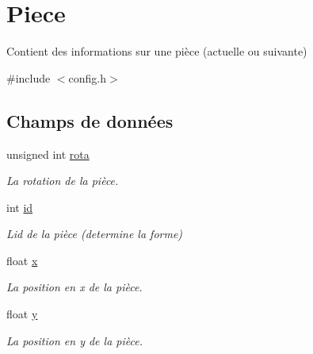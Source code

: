 \hypertarget{structPiece}{}\section{Piece}
\label{structPiece}


Contient des informations sur une pièce (actuelle ou suivante)  




{\ttfamily \#include $<$config.\+h$>$}

\subsection*{Champs de données}
\begin{DoxyCompactItemize}
\item 
\mbox{\label{structPiece_af1951f72b2ec34674a8575bc71398e1c}} 
unsigned int \hyperlink{structPiece_af1951f72b2ec34674a8575bc71398e1c}{rota}
\begin{DoxyCompactList}\small\item\em La rotation de la pièce. \end{DoxyCompactList}\item 
\mbox{\label{structPiece_a7441ef0865bcb3db9b8064dd7375c1ea}} 
int \hyperlink{structPiece_a7441ef0865bcb3db9b8064dd7375c1ea}{id}
\begin{DoxyCompactList}\small\item\em L\textquotesingle{}id de la pièce (determine la forme) \end{DoxyCompactList}\item 
\mbox{\label{structPiece_ad0da36b2558901e21e7a30f6c227a45e}} 
float \hyperlink{structPiece_ad0da36b2558901e21e7a30f6c227a45e}{x}
\begin{DoxyCompactList}\small\item\em La position en x de la pièce. \end{DoxyCompactList}\item 
\mbox{\label{structPiece_aa4f0d3eebc3c443f9be81bf48561a217}} 
float \hyperlink{structPiece_aa4f0d3eebc3c443f9be81bf48561a217}{y}
\begin{DoxyCompactList}\small\item\em La position en y de la pièce. \end{DoxyCompactList}\item 

\end{DoxyCompactItemize}
